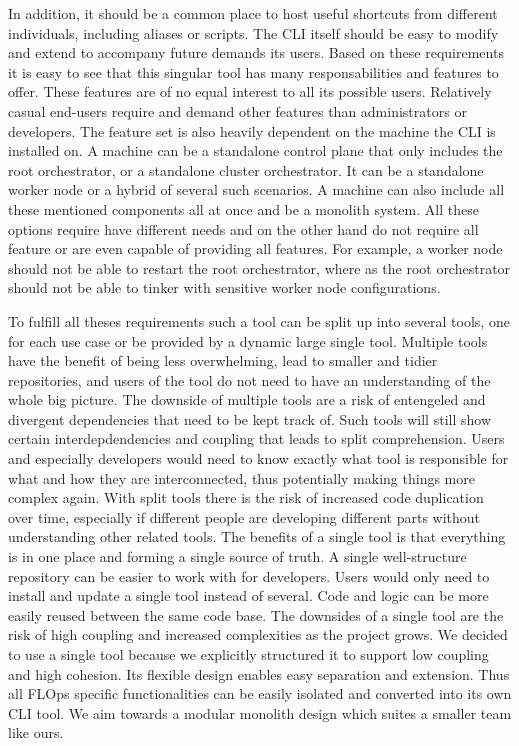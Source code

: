In addition, it should be a common place to host useful shortcuts from different individuals, including aliases or scripts.
The CLI itself should be easy to modify and extend to accompany future demands its users.
\vspace{5mm}
\newline
Based on these requirements it is easy to see that this singular tool has many responsabilities and features to offer.
These features are of no equal interest to all its possible users.
Relatively casual end-users require and demand other features than administrators or developers.
The feature set is also heavily dependent on the machine the CLI is installed on.
A machine can be a standalone control plane that only includes the root orchestrator, or a standalone cluster orchestrator.
It can be a standalone worker node or a hybrid of several such scenarios.
A machine can also include all these mentioned components all at once and be a monolith system.
All these options require have different needs and on the other hand do not require all feature or are even capable of providing all features.
For example, a worker node should not be able to restart the root orchestrator, where as the root orchestrator should not be able to tinker with sensitive worker node configurations.

To fulfill all theses requirements such a tool can be split up into several tools, one for each use case or be provided by a dynamic large single tool.
Multiple tools have the benefit of being less overwhelming, lead to smaller and tidier repositories, and users of the tool do not need to have an understanding of the whole big picture.
The downside of multiple tools are a risk of entengeled and divergent dependencies that need to be kept track of.
Such tools will still show certain interdepdendencies and coupling that leads to split comprehension.
Users and especially developers would need to know exactly what tool is responsible for what and how they are interconnected, thus potentially making things more complex again.
With split tools there is the risk of increased code duplication over time, especially if different people are developing different parts without understanding other related tools.
The benefits of a single tool is that everything is in one place and forming a single source of truth.
A single well-structure repository can be easier to work with for developers.
Users would only need to install and update a single tool instead of several.
Code and logic can be more easily reused between the same code base.
The downsides of a single tool are the risk of high coupling and increased complexities as the project grows.
We decided to use a single tool because we explicitly structured it to support low coupling and high cohesion.
Its flexible design enables easy separation and extension.
Thus all FLOps specific functionalities can be easily isolated and converted into its own CLI tool.
We aim towards a modular monolith design which suites a smaller team like ours.

